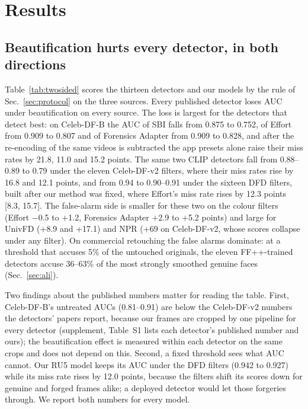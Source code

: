 
\section{Results}
\label{sec:results}
\subsection{Beautification hurts every detector, in both directions}
\label{sec:measure}
Table~\ref{tab:twosided} scores the thirteen detectors and our models by the rule of Sec.~\ref{sec:protocol} on the three
sources. Every published detector loses AUC under beautification on every source. The loss is largest for the detectors
that detect best: on Celeb-DF-B the AUC of SBI falls from 0.875 to 0.752, of Effort from 0.909 to 0.807 and of Forensics
Adapter from 0.909 to 0.828, and after the re-encoding of the same videos is subtracted the app presets alone raise their
miss rates by 21.8, 11.0 and 15.2 points. The same two CLIP detectors fall from 0.88--0.89 to 0.79 under the eleven
Celeb-DF-v2 filters, where their miss rates rise by 16.8 and 12.1 points, and from 0.94 to 0.90--0.91 under the sixteen DFD
filters, built after our method was fixed, where Effort's miss rate rises by 12.3 points [8.3, 15.7]. The false-alarm side
is smaller for these two on the colour filters (Effort $-$0.5 to $+$1.2, Forensics Adapter $+$2.9 to $+$5.2 points) and
large for UnivFD (+8.9 and +17.1) and NPR (+69 on Celeb-DF-v2, whose scores collapse under any filter). On commercial
retouching the false alarms dominate: at a threshold that accuses 5\% of the untouched originals, the eleven FF++-trained
detectors accuse 36--63\% of the most strongly smoothed genuine faces (Sec.~\ref{sec:ali}).

Two findings about the published numbers matter for reading the table. First, Celeb-DF-B's untreated AUCs (0.81--0.91) are
below the Celeb-DF-v2 numbers the detectors' papers report, because our frames are cropped by one pipeline for every
detector (supplement, Table~S1 lists each detector's published number and ours); the beautification effect is measured
within each detector on the same crops and does not depend on this. Second, a fixed threshold sees what AUC cannot. Our
RU5 model keeps its AUC under the DFD filters (0.942 to 0.927) while its miss rate rises by 12.0 points, because the filters
shift its scores down for genuine and forged frames alike; a deployed detector would let those forgeries through. We report
both numbers for every model.


